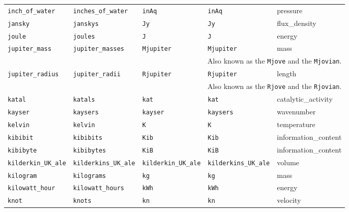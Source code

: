 \begin{landscape}
\begin{center}
\begin{longtable}{|lllll|}
{\tt\footnotesize inch\_of\_water} & {\tt\footnotesize inches\_of\_water} & {\tt\footnotesize inAq} & {\tt\footnotesize inAq} & pressure \\
{\tt\footnotesize jansky} & {\tt\footnotesize janskys} & {\tt\footnotesize Jy} & {\tt\footnotesize Jy} & flux\_density \\
{\tt\footnotesize joule} & {\tt\footnotesize joules} & {\tt\footnotesize J} & {\tt\footnotesize J} & energy \\
{\tt\footnotesize jupiter\_mass} & {\tt\footnotesize jupiter\_masses} & {\tt\footnotesize Mjupiter} & {\tt\footnotesize Mjupiter} & mass \\
\multicolumn{5}{|r|}{\footnotesize Also known as the {\tt Mjove} and the {\tt Mjovian}.} \\
{\tt\footnotesize jupiter\_radius} & {\tt\footnotesize jupiter\_radii} & {\tt\footnotesize Rjupiter} & {\tt\footnotesize Rjupiter} & length \\
\multicolumn{5}{|r|}{\footnotesize Also known as the {\tt Rjove} and the {\tt Rjovian}.} \\
{\tt\footnotesize katal} & {\tt\footnotesize katals} & {\tt\footnotesize kat} & {\tt\footnotesize kat} & catalytic\_activity \\
{\tt\footnotesize kayser} & {\tt\footnotesize kaysers} & {\tt\footnotesize kayser} & {\tt\footnotesize kaysers} & wavenumber \\
{\tt\footnotesize kelvin} & {\tt\footnotesize kelvin} & {\tt\footnotesize K} & {\tt\footnotesize K} & temperature \\
{\tt\footnotesize kibibit} & {\tt\footnotesize kibibits} & {\tt\footnotesize Kib} & {\tt\footnotesize Kib} & information\_content \\
{\tt\footnotesize kibibyte} & {\tt\footnotesize kibibytes} & {\tt\footnotesize KiB} & {\tt\footnotesize KiB} & information\_content \\
{\tt\footnotesize kilderkin\_UK\_ale} & {\tt\footnotesize kilderkins\_UK\_ale} & {\tt\footnotesize kilderkin\_UK\_ale} & {\tt\footnotesize kilderkins\_UK\_ale} & volume \\
{\tt\footnotesize kilogram} & {\tt\footnotesize kilograms} & {\tt\footnotesize kg} & {\tt\footnotesize kg} & mass \\
{\tt\footnotesize kilowatt\_hour} & {\tt\footnotesize kilowatt\_hours} & {\tt\footnotesize kWh} & {\tt\footnotesize kWh} & energy \\
{\tt\footnotesize knot} & {\tt\footnotesize knots} & {\tt\footnotesize kn} & {\tt\footnotesize kn} & velocity \\

\end{longtable}
\end{center}
\end{landscape}
